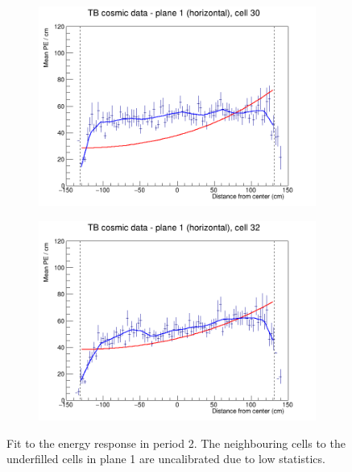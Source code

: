 \documentclass[12pt,a4paper]{article}
\begin{document}
\begin{figure}[h]
  \begin{subfigure}{0.5\textwidth}
    \includegraphics[width=\linewidth]{RelativeCalibrationResults/p2_001_030.png}
  \end{subfigure}
  \begin{subfigure}{0.5\textwidth}
    \includegraphics[width=\linewidth]{RelativeCalibrationResults/p2_001_032.png}
  \end{subfigure}
  \caption{Fit to the energy response in period 2. The neighbouring cells to the underfilled cells in plane 1 are uncalibrated due to low statistics.}
  \label{figAttenfitResultsPerio2_UnderfilledCellsPlane01}
\end{figure}
\end{document}

